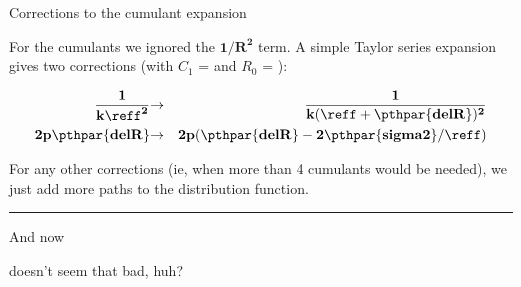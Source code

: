 \begin{slide}{Corrections to the cumulant expansion}
  \small
  \begin{cenpage}{105mm}\setlength{\baselineskip}{11pt}
   
    
    For the cumulants we ignored the $\mathbf{1/R^2}$ term.  A simple
    Taylor series expansion gives two corrections (with $C_1$ =
     and $R_0$ = ):
    
    \begin{eqnarray*}
      {\displaystyle{\mathbf{\frac{1}{k\reff^2}}}} & 
      {\displaystyle{\mathbf{\rightarrow}}} & 
      {\displaystyle{\mathbf{\frac{1}{k(\reff + \pthpar{delR})^2} }}} \\
      {\displaystyle{\mathbf{2p \pthpar{delR}}}}  &
      {\displaystyle{\mathbf{\rightarrow}}} & 
      {\displaystyle{\mathbf{2p(\pthpar{delR}- 2 \pthpar{sigma2}/{\reff}) }}} \\
    \end{eqnarray*}       



    
      For any other corrections (ie, when more than 4 cumulants would be
    needed), we just add more paths to the distribution function.

    \vmm \hrule \vmm

    And now \vmm
    
    
    \vmm \vmm
    
    doesn't seem that bad, huh? 

\end{cenpage}
\vfill
\end{slide} 


